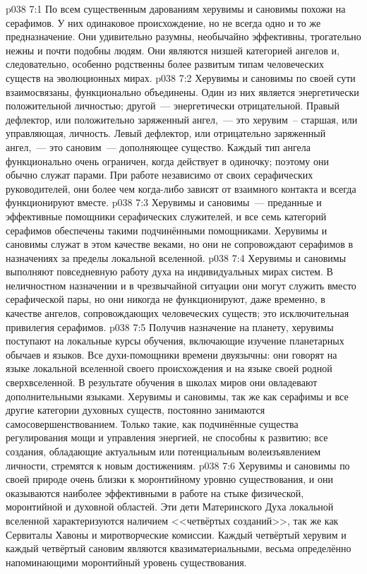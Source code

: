 \vs p038 7:1 По всем существенным дарованиям херувимы и сановимы похожи на серафимов. У них одинаковое происхождение, но не всегда одно и то же предназначение. Они удивительно разумны, необычайно эффективны, трогательно нежны и почти подобны людям. Они являются низшей категорией ангелов и, следовательно, особенно родственны более развитым типам человеческих существ на эволюционных мирах.
\vs p038 7:2 Херувимы и сановимы по своей сути взаимосвязаны, функционально объединены. Один из них является энергетически положительной личностью; другой~--- энергетически отрицательной. Правый дефлектор, или положительно заряженный ангел,~--- это херувим~-- старшая, или управляющая, личность. Левый дефлектор, или отрицательно заряженный ангел,~--- это сановим~--- дополняющее существо. Каждый тип ангела функционально очень ограничен, когда действует в одиночку; поэтому они обычно служат парами. При работе независимо от своих серафических руководителей, они более чем когда\hyp{}либо зависят от взаимного контакта и всегда функционируют вместе.
\vs p038 7:3 \pc Херувимы и сановимы~--- преданные и эффективные помощники серафических служителей, и все семь категорий серафимов обеспечены такими подчинёнными помощниками. Херувимы и сановимы служат в этом качестве веками, но они не сопровождают серафимов в назначениях за пределы локальной вселенной.
\vs p038 7:4 Херувимы и сановимы выполняют повседневную работу духа на индивидуальных мирах систем. В неличностном назначении и в чрезвычайной ситуации они могут служить вместо серафической пары, но они никогда не функционируют, даже временно, в качестве ангелов, сопровождающих человеческих существ; это исключительная привилегия серафимов.
\vs p038 7:5 \pc Получив назначение на планету, херувимы поступают на локальные курсы обучения, включающие изучение планетарных обычаев и языков. Все духи\hyp{}помощники времени двуязычны: они говорят на языке локальной вселенной своего происхождения и на языке своей родной сверхвселенной. В результате обучения в школах миров они овладевают дополнительными языками. Херувимы и сановимы, так же как серафимы и все другие категории духовных существ, постоянно занимаются самосовершенствованием. Только такие, как подчинённые существа регулирования мощи и управления энергией, не способны к развитию; все создания, обладающие актуальным или потенциальным волеизъявлением личности, стремятся к новым достижениям.
\vs p038 7:6 \pc Херувимы и сановимы по своей природе очень близки к моронтийному уровню существования, и они оказываются наиболее эффективными в работе на стыке физической, моронтийной и духовной областей. Эти дети Материнского Духа локальной вселенной характеризуются наличием <<четвёртых созданий>>, так же как Сервиталы Хавоны и миротворческие комиссии. Каждый четвёртый херувим и каждый четвёртый сановим являются квазиматериальными, весьма определённо напоминающими моронтийный уровень существования.
